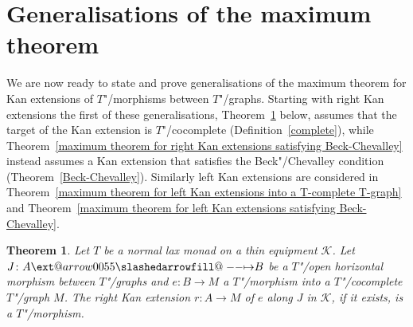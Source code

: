 \documentclass[preprint, a4paper]{elsarticle}
\makeatletter
\def\slashedarrowfill@#1#2#3#4#5{%
  $\m@th\thickmuskip0mu\medmuskip\thickmuskip\thinmuskip\thickmuskip
   \relax#5#1\mkern-7mu%
   \cleaders\hbox{$#5\mkern-2mu#2\mkern-2mu$}\hfill
   \mathclap{#3}\mathclap{#2}%
   \cleaders\hbox{$#5\mkern-2mu#2\mkern-2mu$}\hfill
   \mkern-7mu#4$%
}
\def\rightslashedarrowfill@{%
  \slashedarrowfill@\relbar\relbar\mapstochar\rightarrow}
\newcommand\xslashedrightarrow[2][]{%
  \ext@arrow 0055{\rightslashedarrowfill@}{#1}{#2}}
\def\slashedrightarrow{\xslashedrightarrow{}}
\newtheorem{theorem}{Theorem}[section]
\theoremstyle{definition}
\theoremstyle{remark}
\providecommand{\defref}[1]{Definition~\ref{#1}}
\providecommand{\thmref}[1]{Theorem~\ref{#1}}
\providecommand{\map}[3]{#1\colon#2\to#3}
\providecommand{\hmap}[3]{#1\colon#2\slashedrightarrow#3}
\providecommand{\catvar}[1]{\mathcal{#1}}
\providecommand{\2}{\mathsf 2}
\providecommand{\K}{\catvar K}
\makeatother
\begin{document}
	\section{Generalisations of the maximum theorem} \label{maximum theorem}
	We are now ready to state and prove generalisations of the maximum theorem for Kan extensions of $T$"/morphisms between $T$"/graphs. Starting with right Kan extensions the first of these generalisations, \thmref{maximum theorem for right Kan extensions into a complete graph} below, assumes that the target of the Kan extension is $T$"/cocomplete (\defref{complete}), while \thmref{maximum theorem for right Kan extensions satisfying Beck-Chevalley} instead assumes a Kan extension that satisfies the Beck"/Chevalley condition (\thmref{Beck-Chevalley}). Similarly left Kan extensions are considered in \thmref{maximum theorem for left Kan extensions into a T-complete T-graph} and \thmref{maximum theorem for left Kan extensions satisfying Beck-Chevalley}.
	\begin{theorem} \label{maximum theorem for right Kan extensions into a complete graph}
		Let $T$ be a normal lax monad on a thin equipment $\K$. Let $\hmap JAB$ be a $T$"/open horizontal morphism between $T$"/graphs and $\map eBM$ a $T$"/morphism into a $T$"/cocomplete $T$"/graph $M$. The right Kan extension $\map rAM$ of $e$ along $J$ in $\K$, if it exists, is a $T$"/morphism.
	\end{theorem}
\end{document}
